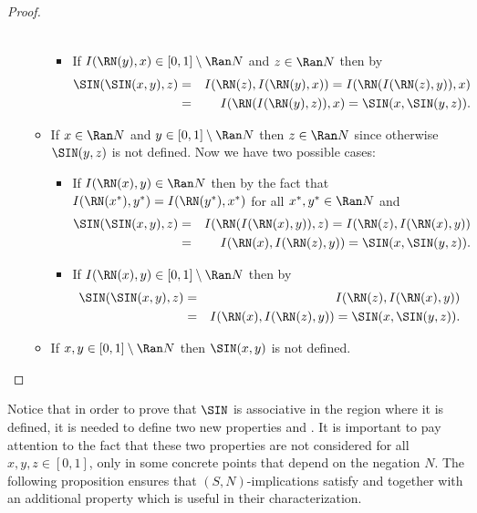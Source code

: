 \begin{proof}
\begin{enumerate}[label=(\roman*)]
\begin{itemize}
\begin{itemize}
\begin{eqnarray*}
				\end{eqnarray*}
				\item If $I(\RN(y),x) \in [0,1] \setminus \Ran N$ and $z \in \Ran N$ then by \Rtwo
				\begin{eqnarray*}
					\SIN(\SIN(x,y),z) &=& I(\RN(z),I(\RN(y),x)) = I(\RN(I(\RN(z),y)),x) \\
					&=& I(\RN(I(\RN(y),z)),x) = \SIN(x,\SIN(y,z)).
				\end{eqnarray*}
			\end{itemize}
			\item If $x \in \Ran N$ and $y \in [0,1] \setminus \Ran N$ then $z \in \Ran N$ since otherwise $\SIN(y,z)$ is not defined. Now we have two possible cases:
			\begin{itemize}
				\item If $I(\RN(x),y) \in \Ran N$ then by the fact that $I(\RN(x^*),y^*) = I(\RN(y^*),x^*)$ for all $x^*,y^* \in \Ran N$ and \EP 
				\begin{eqnarray*}
					\SIN(\SIN(x,y),z) &=& I(\RN(I(\RN(x),y)),z) = I(\RN(z),I(\RN(x),y)) \\
					&=& I(\RN(x),I(\RN(z),y)) =\SIN(x,\SIN(y,z)).
				\end{eqnarray*}	
				\item If $I(\RN(x),y) \in [0,1] \setminus \Ran N$ then by \EP
				\begin{eqnarray*}
				\SIN(\SIN(x,y),z) &=& I(\RN(z),I(\RN(x),y)) \\
				 &=& I(\RN(x),I(\RN(z),y)) = \SIN(x,\SIN(y,z)).
				\end{eqnarray*}
			\end{itemize}
			\item If $x,y \in [0,1] \setminus \Ran N$ then $\SIN(x,y)$ is not defined.
		\end{itemize}
	\end{enumerate}
\end{proof}

Notice that in order to prove that $\SIN$ is associative in the region where it is defined, it is needed to define two new properties \Rone and \Rtwo. It is important to pay attention to the fact that these two properties are not considered for all $x,y,z \in [0,1]$, only in some concrete points that depend on the negation $N$. The following proposition ensures that $(S,N)$-implications satisfy \Rone and \Rtwo together with an additional property which is useful in their characterization.

